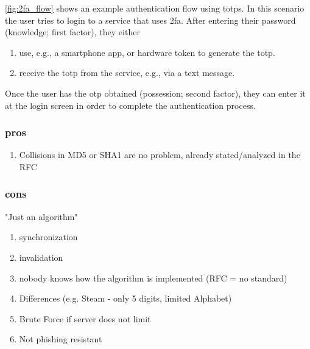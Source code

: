\autoref{fig:2fa_flow} shows an example authentication flow using \glspl{totp}. In this scenario the user tries to login to a service that uses \gls{2fa}. After entering their password (knowledge; first factor), they either

\begin{enumerate}[label=(\alph*)]
	\item use, e.g., a smartphone app, or hardware token to generate the \gls{totp}.
	\item receive the \gls{totp} from the service, e.g., via a text message.
\end{enumerate}

Once the user has the \gls{otp} obtained (possession; second factor), they can enter it at the login screen in order to complete the authentication process.

\subsubsection{pros}

\begin{enumerate}
	\item Collisions in MD5 or SHA1 are no problem, already stated/analyzed in the RFC
\end{enumerate}

\subsubsection{cons}

"Just an algorithm"

\begin{enumerate}
	\item synchronization
	\item invalidation
	\item nobody knows how the algorithm is implemented (RFC = no standard)
	\item Differences (e.g. Steam - only 5 digits, limited Alphabet)
	\item Brute Force if server does not limit
	\item Not phishing resistant
\end{enumerate}